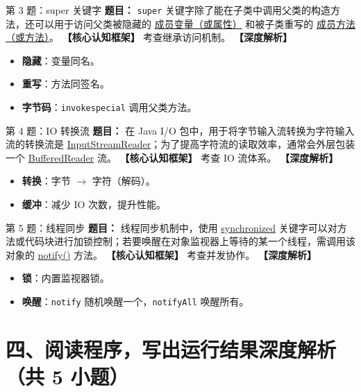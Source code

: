 ﻿\documentclass[12pt, a4paper]{ctexart}
\begin{document}
\begin{bluebox}{第 3 题：super 关键字}
	\textbf{题目：} \texttt{super} 关键字除了能在子类中调用父类的构造方法，还可以用于访问父类被隐藏的 \underline{成员变量（或属性）} 和被子类重写的 \underline{成员方法（或方法）}。
	\textbf{【核心认知框架】} 考查继承访问机制。
	\textbf{【深度解析】}
	\begin{itemize}[leftmargin=*, nosep]
		\item \textbf{隐藏}：变量同名。
		\item \textbf{重写}：方法同签名。
		\item \textbf{字节码}：\texttt{invokespecial} 调用父类方法。
	\end{itemize}
\end{bluebox}

\begin{bluebox}{第 4 题：IO 转换流}
	\textbf{题目：} 在 Java I/O 包中，用于将字节输入流转换为字符输入流的转换流是 \underline{InputStreamReader}；为了提高字符流的读取效率，通常会外层包装一个 \underline{BufferedReader} 流。
	\textbf{【核心认知框架】} 考查 IO 流体系。
	\textbf{【深度解析】}
	\begin{itemize}[leftmargin=*, nosep]
		\item \textbf{转换}：字节 $\rightarrow$ 字符（解码）。
		\item \textbf{缓冲}：减少 IO 次数，提升性能。
	\end{itemize}
\end{bluebox}

\begin{bluebox}{第 5 题：线程同步}
	\textbf{题目：} 线程同步机制中，使用 \underline{synchronized} 关键字可以对方法或代码块进行加锁控制；若要唤醒在对象监视器上等待的某一个线程，需调用该对象的 \underline{notify()} 方法。
	\textbf{【核心认知框架】} 考查并发协作。
	\textbf{【深度解析】}
	\begin{itemize}[leftmargin=*, nosep]
		\item \textbf{锁}：内置监视器锁。
		\item \textbf{唤醒}：\texttt{notify} 随机唤醒一个，\texttt{notifyAll} 唤醒所有。
	\end{itemize}
\end{bluebox}

\section{四、阅读程序，写出运行结果深度解析（共 5 小题）}
\end{document}
